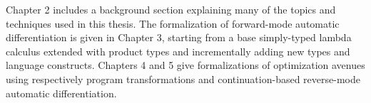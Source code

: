 Chapter 2 includes a background section explaining many of the topics and techniques used in this thesis. The formalization of forward-mode automatic differentiation is given in Chapter 3, starting from a base simply-typed lambda calculus extended with product types and incrementally adding new types and language constructs. Chapters 4 and 5 give formalizations of optimization avenues using respectively program transformations and continuation-based reverse-mode automatic differentiation.

